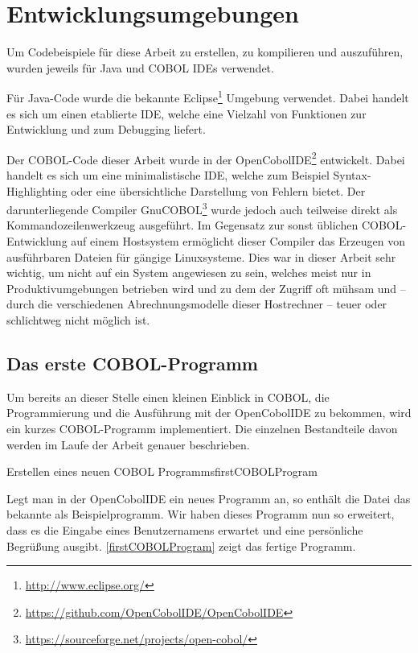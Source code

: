 \section{Entwicklungsumgebungen}
Um Codebeispiele für diese Arbeit zu erstellen, zu kompilieren und auszuführen, wurden jeweils für Java und COBOL IDEs verwendet.

Für Java-Code wurde die bekannte Eclipse\footnote{\url{http://www.eclipse.org/}} Umgebung verwendet. Dabei handelt es sich um einen etablierte IDE, welche eine Vielzahl von Funktionen zur Entwicklung und zum Debugging liefert.

Der COBOL-Code dieser Arbeit wurde in der OpenCobolIDE\footnote{\url{https://github.com/OpenCobolIDE/OpenCobolIDE}} entwickelt. Dabei handelt es sich um eine minimalistische IDE, welche zum Beispiel Syntax-Highlighting oder eine übersichtliche Darstellung von Fehlern bietet. Der darunterliegende Compiler GnuCOBOL\footnote{\url{https://sourceforge.net/projects/open-cobol/}} wurde jedoch auch teilweise direkt als Kommandozeilenwerkzeug ausgeführt. Im Gegensatz zur sonst üblichen COBOL-Entwicklung auf einem Hostsystem ermöglicht dieser Compiler das Erzeugen von ausführbaren Dateien für gängige Linuxsysteme. Dies war in dieser Arbeit sehr wichtig, um nicht auf ein System angewiesen zu sein, welches meist nur in Produktivumgebungen betrieben wird und zu dem der Zugriff oft mühsam und -- durch die verschiedenen Abrechnungsmodelle dieser Hostrechner -- teuer oder schlichtweg nicht möglich ist.

\subsection*{Das erste COBOL-Programm}

Um bereits an dieser Stelle einen kleinen Einblick in COBOL, die Programmierung und die Ausführung mit der OpenCobolIDE zu bekommen, wird ein kurzes COBOL-Programm implementiert. Die einzelnen Bestandteile davon werden im Laufe der Arbeit genauer beschrieben.

\begin{codeWithCaption}{Erstellen eines neuen COBOL Programms}{firstCOBOLProgram}
\end{codeWithCaption}

Legt man in der OpenCobolIDE ein neues Programm an, so enthält die Datei das bekannte  als Beispielprogramm. Wir haben dieses Programm nun so erweitert, dass es die Eingabe eines Benutzernamens erwartet und eine persönliche Begrüßung ausgibt. \autoref{firstCOBOLProgram} zeigt das fertige Programm.


